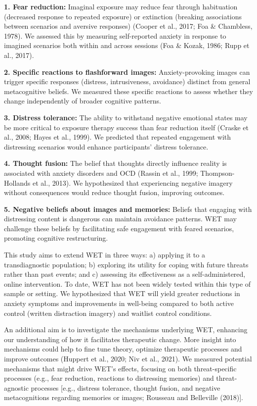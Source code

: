 \documentclass[
  man,floatsintext]{apa7}
\begin{document}
\textbf{1. Fear reduction:} Imaginal exposure may reduce fear through habituation (decreased response to repeated exposure) or extinction (breaking associations between scenarios and aversive responses) (Cooper et al., 2017; Foa \& Chambless, 1978).
We assessed this by measuring self-reported anxiety in response to imagined scenarios both within and across sessions (Foa \& Kozak, 1986; Rupp et al., 2017).

\textbf{2. Specific reactions to flashforward images:} Anxiety-provoking images can trigger specific responses (distress, intrusiveness, avoidance) distinct from general metacognitive beliefs.
We measured these specific reactions to assess whether they change independently of broader cognitive patterns.

\textbf{3. Distress tolerance:} The ability to withstand negative emotional states may be more critical to exposure therapy success than fear reduction itself (Craske et al., 2008; Hayes et al., 1999).
We predicted that repeated engagement with distressing scenarios would enhance participants' distress tolerance.

\textbf{4. Thought fusion:} The belief that thoughts directly influence reality is associated with anxiety disorders and OCD (Rassin et al., 1999; Thompson-Hollands et al., 2013).
We hypothesized that experiencing negative imagery without consequences would reduce thought fusion, improving outcomes.

\textbf{5. Negative beliefs about images and memories:} Beliefs that engaging with distressing content is dangerous can maintain avoidance patterns.
WET may challenge these beliefs by facilitating safe engagement with feared scenarios, promoting cognitive restructuring.

This study aims to extend WET in three ways: a) applying it to a transdiagnostic population; b) exploring its utility for coping with future threats rather than past events; and c) assessing its effectiveness as a self-administered, online intervention.
To date, WET has not been widely tested within this type of sample or setting.
We hypothesized that WET will yield greater reductions in anxiety symptoms and improvements in well-being compared to both active control (written distraction imagery) and waitlist control conditions.

An additional aim is to investigate the mechanisms underlying WET, enhancing our understanding of how it facilitates therapeutic change.
More insight into mechanisms could help to fine tune theory, optimize therapeutic processes and improve outcomes (Huppert et al., 2020; Niv et al., 2021).
We measured potential mechanisms that might drive WET's effects, focusing on both threat-specific processes (e.g., fear reduction, reactions to distressing memories) and threat-agnostic processes {[}e.g., distress tolerance, thought fusion, and negative metacognitions regarding memories or images; Rousseau and Belleville (2018){]}.
\end{document}
